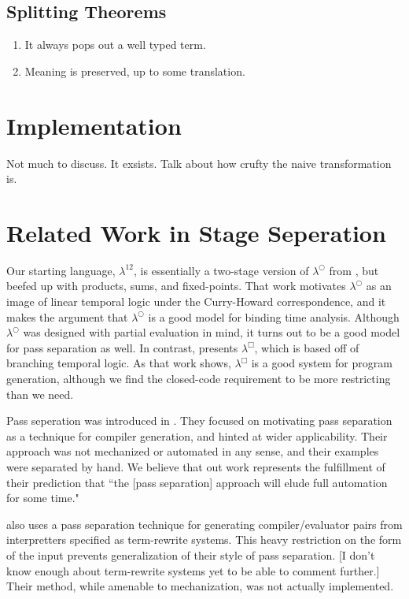 \documentclass{article}
\begin{document}
\subsection {Splitting Theorems}

\begin{enumerate}
\item It always pops out a well typed term.
\item Meaning is preserved, up to some translation.
\end{enumerate}

\section {Implementation}

Not much to discuss.  It exsists.  Talk about how crufty the naive transformation is.

\section{Related Work in Stage Seperation}

Our starting language, $\lambda^{12}$, is essentially a two-stage version of $\lambda^\bigcirc$ from \cite{davies96}, but beefed up with products, sums, and fixed-points.  That work motivates $\lambda^\bigcirc$ as an image of linear temporal logic under the Curry-Howard correspondence, and it makes the argument that $\lambda^\bigcirc$ is a good model for binding time analysis.  Although $\lambda^\bigcirc$ was designed with partial evaluation in mind, it turns out to be a good model for pass separation as well.  In contrast, \cite{davies01} presents $\lambda^\Box$, which is based off of branching temporal logic.  As that work shows, $\lambda^\Box$ is a good system for program generation, although we find the closed-code requirement to be more restricting than we need.

Pass seperation was introduced in \cite{jorring}.  They focused on motivating pass separation as a technique for compiler generation, and hinted at wider applicability.  Their approach was not mechanized or automated in any sense, and their examples were separated by hand.  We believe that out work represents the fulfillment of their prediction that ``the [pass separation] approach will elude full automation for some time."

\cite{hannan94} also uses a pass separation technique for generating compiler/evaluator pairs from interpretters specified as term-rewrite systems.  This heavy restriction on the form of the input prevents generalization of their style of pass separation.  [I don't know enough about term-rewrite systems yet to be able to comment further.]  Their method, while amenable to mechanization, was not actually implemented.
\end{document}
